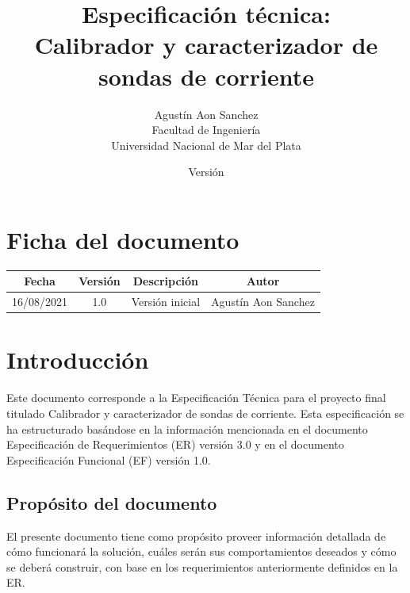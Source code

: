 \documentclass[titlepage, 12pt]{article}
\title{Especificación técnica:\\Calibrador y caracterizador de sondas de corriente}
\author{Agustín Aon Sanchez\\
Facultad de Ingeniería\\
Universidad Nacional de Mar del Plata}
\date{Versión \version}
\newcommand{\fecha}{16/08/2021} %
\newcommand{\version}{1.0}
\begin{document}
\maketitle



\section{Ficha del documento}
\begin{table}[!hbtp]
  \centering
  \begin{tabular}{|c|c|c|c|}
  \hline
  \rowcolor[HTML]{C0C0C0}
  Fecha  & Versión  & Descripción     & Autor               \\ \hline
  \fecha & \version & Versión inicial & Agustín Aon Sanchez \\ \hline
  \end{tabular}
\end{table}

\newpage
\tableofcontents
\newpage
\listoffigures
\listoftables
\newpage

\section{Introducción}
Este documento corresponde a la Especificación Técnica para el proyecto final titulado Calibrador y caracterizador de sondas de corriente. Esta especificación se ha estructurado basándose en la información mencionada en el documento Especificación de Requerimientos (ER) versión 3.0 y en el documento Especificación Funcional (EF) versión 1.0. %

  \subsection{Propósito del documento}
  El presente documento tiene como propósito proveer información detallada de cómo funcionará la solución, cuáles serán sus comportamientos deseados y cómo se deberá construir, con base en los requerimientos anteriormente definidos en la ER.
\end{document}

